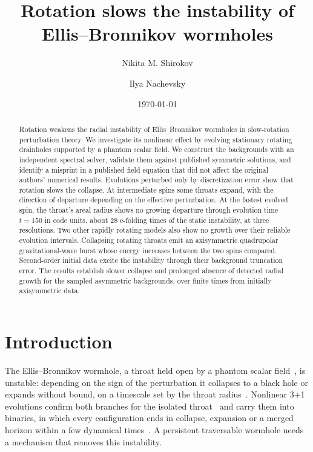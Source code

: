 \documentclass[twocolumn,floatfix,aps,prd,superscriptaddress,nofootinbib]{revtex4-2}
\begin{document}
\raggedbottom

\title{Rotation slows the instability of Ellis--Bronnikov wormholes}

\author{Nikita M. Shirokov}
\author{Ilya Nachevsky}
\date{\today}

\begin{abstract}
Rotation weakens the radial instability of Ellis--Bronnikov wormholes in slow-rotation perturbation theory. We investigate its nonlinear effect by evolving stationary rotating drainholes supported by a phantom scalar field. We construct the backgrounds with an independent spectral solver, validate them against published symmetric solutions, and identify a misprint in a published field equation that did not affect the original authors' numerical results. Evolutions perturbed only by discretization error show that rotation slows the collapse. At intermediate spins some throats expand, with the direction of departure depending on the effective perturbation. At the fastest evolved spin, the throat's areal radius shows no growing departure through evolution time $t=150$ in code units, about 28 e-folding times of the static instability, at three resolutions. Two other rapidly rotating models also show no growth over their reliable evolution intervals. Collapsing rotating throats emit an axisymmetric quadrupolar gravitational-wave burst whose energy increases between the two spins compared. Second-order initial data excite the instability through their background truncation error. The results establish slower collapse and prolonged absence of detected radial growth for the sampled asymmetric backgrounds, over finite times from initially axisymmetric data.
\end{abstract}

\maketitle

\section{Introduction}
\label{sec:intro}

The Ellis--Bronnikov wormhole, a throat held open by a phantom scalar field~\cite{ellis1973,bronnikov1973,morris_thorne1988,visser1995}, is unstable: depending on the sign of the perturbation it collapses to a black hole or expands without bound, on a timescale set by the throat radius~\cite{gonzalez2009lin,gonzalez2009,shinkai2002,bronnikov2011,cremona2019}. Nonlinear 3+1 evolutions confirm both branches for the isolated throat~\cite{shirokov2026} and carry them into binaries, in which every configuration ends in collapse, expansion or a merged horizon within a few dynamical times~\cite{shirokov2026c}. A persistent traversable wormhole needs a mechanism that removes this instability.
\end{document}
